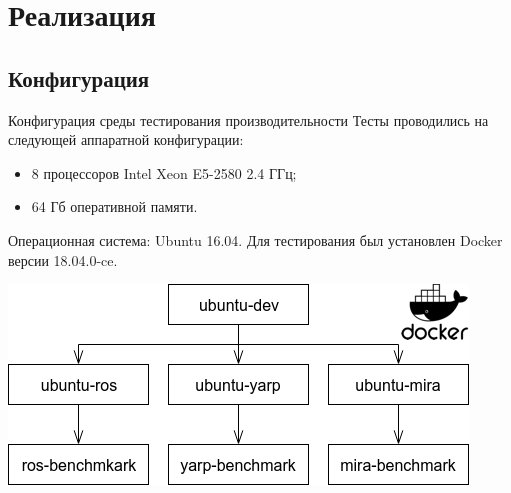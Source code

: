 \section{Реализация}


\subsection{Конфигурация}
\begin{frame}{Конфигурация среды тестирования производительности}
	Тесты проводились на следующей аппаратной конфигурации:
	\begin{itemize}
		\item 8 процессоров Intel Xeon E5-2580 2.4 ГГц;
		\item 64 Гб оперативной памяти.
	\end{itemize}
	Операционная система: Ubuntu 16.04. Для тестирования был установлен Docker версии 18.04.0-ce.
	
	\vspace{1em}
	\centering
	\includegraphics[scale=.5]{img/dockers.png}
\end{frame}

